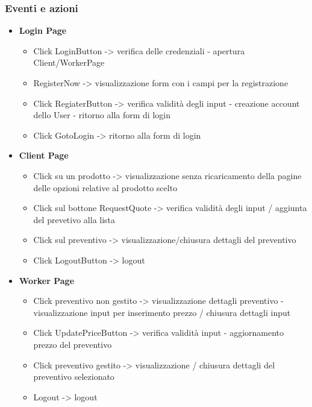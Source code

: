 \documentclass[a4paper, 12pt]{article}
\begin{document}
\subsubsection{Eventi e azioni}
\begin{itemize}
	\item \textbf{Login Page}
	\begin{itemize}
		\item Click LoginButton -> verifica delle credenziali - apertura Client/WorkerPage
		\item RegisterNow -> visualizzazione form con i campi per la registrazione
		\item Click RegiaterButton -> verifica validità degli input - creazione account dello User - ritorno alla form di login
		\item Click GotoLogin -> ritorno alla form di login
	\end{itemize}
	\item \textbf{Client Page}
	\begin{itemize}
		\item Click su un prodotto -> visualizzazione senza ricaricamento della pagine delle opzioni relative al prodotto scelto
		\item Click sul bottone RequestQuote -> verifica validità degli input / aggiunta del prevetivo alla lista 
		\item Click sul preventivo -> visualizzazione/chiusura dettagli del preventivo
		\item Click LogoutButton -> logout
	\end{itemize}
	\item \textbf{Worker Page}
	\begin{itemize}
		\item Click preventivo non gestito -> visualizzazione dettagli preventivo - visualizzazione input per inserimento prezzo / chiusura dettagli input 
		\item Click UpdatePriceButton -> verifica validità input - aggiornamento prezzo del preventivo 
		\item Click preventivo gestito -> visualizzazione / chiusura dettagli del preventivo selezionato 
		\item Logout -> logout 
	\end{itemize}
\end{itemize}
\newpage
\end{document}
